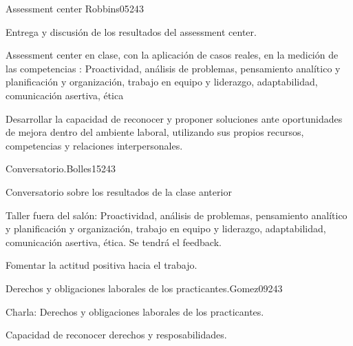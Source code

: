 \begin{syllabus}
\begin{unit}{Assessment center }{}{Robbins05}{24}{3}
   \begin{topics}
      \item Entrega y discusión de los resultados del assessment center.
      \item Assessment center en clase, con la aplicación de casos reales, en la medición de las competencias : Proactividad, análisis de problemas, pensamiento analítico y planificación y organización, trabajo en equipo y liderazgo, adaptabilidad, comunicación asertiva, ética
    \end{topics}

   \begin{learningoutcomes}
      \item Desarrollar la capacidad de reconocer y proponer soluciones ante oportunidades de mejora dentro del ambiente laboral, utilizando sus propios recursos, competencias y relaciones interpersonales.
   \end{learningoutcomes}
\end{unit}

\begin{unit}{Conversatorio.}{}{Bolles15}{24}{3}
   \begin{topics}
      \item Conversatorio sobre los resultados de la clase anterior
      \item Taller fuera del salón: Proactividad, análisis de problemas, pensamiento analítico y planificación y organización, trabajo en equipo y liderazgo, adaptabilidad, comunicación asertiva, ética. Se tendrá el feedback.
   \end{topics}

   \begin{learningoutcomes}
      \item Fomentar la actitud positiva hacia el trabajo.
   \end{learningoutcomes}
\end{unit}

\begin{unit}{Derechos y obligaciones laborales de los practicantes.}{}{Gomez09}{24}{3}
   \begin{topics}
      \item Charla: Derechos y obligaciones laborales de los practicantes.
   \end{topics}

   \begin{learningoutcomes}
      \item Capacidad de reconocer derechos y  resposabilidades.
   \end{learningoutcomes}
\end{unit}


\end{syllabus}
